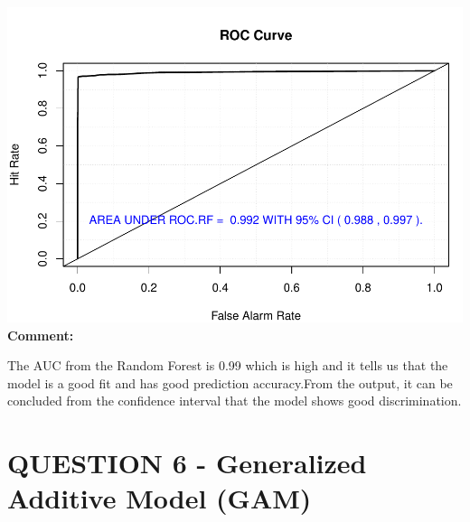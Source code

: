 \documentclass[
  11pt,
]{article}
\newenvironment{Shaded}{\begin{snugshade}}{\end{snugshade}}
\newcommand{\AttributeTok}[1]{\textcolor[rgb]{0.13,0.29,0.53}{#1}}
\newcommand{\ConstantTok}[1]{\textcolor[rgb]{0.56,0.35,0.01}{#1}}
\newcommand{\DecValTok}[1]{\textcolor[rgb]{0.00,0.00,0.81}{#1}}
\newcommand{\FloatTok}[1]{\textcolor[rgb]{0.00,0.00,0.81}{#1}}
\newcommand{\FunctionTok}[1]{\textcolor[rgb]{0.13,0.29,0.53}{\textbf{#1}}}
\newcommand{\NormalTok}[1]{#1}
\newcommand{\SpecialCharTok}[1]{\textcolor[rgb]{0.81,0.36,0.00}{\textbf{#1}}}
\newcommand{\StringTok}[1]{\textcolor[rgb]{0.31,0.60,0.02}{#1}}
\begin{document}
\begin{Shaded}
\end{Shaded}

\includegraphics[width=0.9\linewidth]{OWUSU_project_files/figure-latex/unnamed-chunk-29-1}\\
\textbf{Comment:}

The AUC from the Random Forest is 0.99 which is high and it tells us
that the model is a good fit and has good prediction accuracy.From the
output, it can be concluded from the confidence interval that the model
shows good discrimination.

\newpage

\section{QUESTION 6 - Generalized Additive Model (GAM)}
\end{document}
